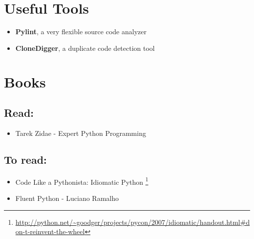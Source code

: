 \documentclass[fleqn,10pt]{SelfArx} %
\begin{document}
	

	\section{Useful Tools}
	
	\begin{itemize}
		\item \textbf{Pylint}, a very flexible source code analyzer
		\item \textbf{CloneDigger}, a duplicate code detection tool
	\end{itemize}
	
	
	\section{Books}
	
	\subsection{Read:}
	\begin{itemize}
		\item Tarek Zidae - Expert Python Programming
	\end{itemize}
	
	\subsection{To read:}	
	\begin{itemize}
		\item Code Like a Pythonista: Idiomatic Python \footnote{\url{http://python.net/~goodger/projects/pycon/2007/idiomatic/handout.html#don-t-reinvent-the-wheel}}
		\item Fluent Python - Luciano Ramalho
	\end{itemize}	
	
\end{document}
